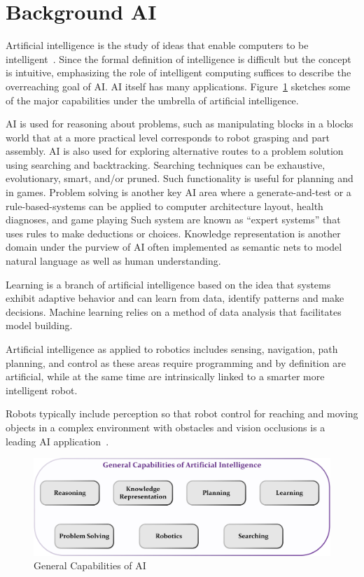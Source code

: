 \section{Background AI}
Artificial intelligence is the study of ideas that enable computers to be intelligent~\cite{winston1992artificial}.  Since the formal definition of intelligence is difficult but the concept is intuitive, emphasizing the role of intelligent computing suffices to describe the overreaching goal of AI. AI itself has many applications. Figure~\ref{fg:AICapabilities} sketches some of the major capabilities under the umbrella of artificial intelligence.

AI is used for reasoning about problems, such as manipulating blocks in a blocks world that at a more practical level  corresponds to robot grasping and part assembly. AI is also used for exploring alternative routes to a problem solution using searching and backtracking. Searching techniques can be exhaustive, evolutionary, smart, and/or pruned. Such functionality is useful for planning and in games.  Problem solving is another key AI area where a generate-and-test or a rule-based-systems can be applied to computer architecture layout, health diagnoses, and game playing  Such system are known as ``expert systems'' that uses rules to make deductions or choices. Knowledge representation is another domain under the purview of AI often implemented as semantic nets to model natural language as well as human understanding.

Learning is a branch of artificial intelligence based on the idea that systems exhibit adaptive behavior and can learn from data, identify patterns and make decisions. Machine learning relies on a method of data analysis that facilitates model building.

Artificial intelligence as applied to robotics  includes sensing, navigation, path planning, and control as these areas require programming and by definition are artificial, while at the same time are intrinsically linked to a smarter more intelligent robot.


Robots typically include perception so that robot control for reaching and moving objects in a complex environment with obstacles and vision occlusions is a leading AI application~\cite{staley2018drl}.


\begin{figure}[!h]
\centering
\includegraphics*[width=0.9\columnwidth]{./Figure/AICapabilities.jpg}
\caption{General Capabilities of AI}
\label{fg:AICapabilities} 
\end{figure}


